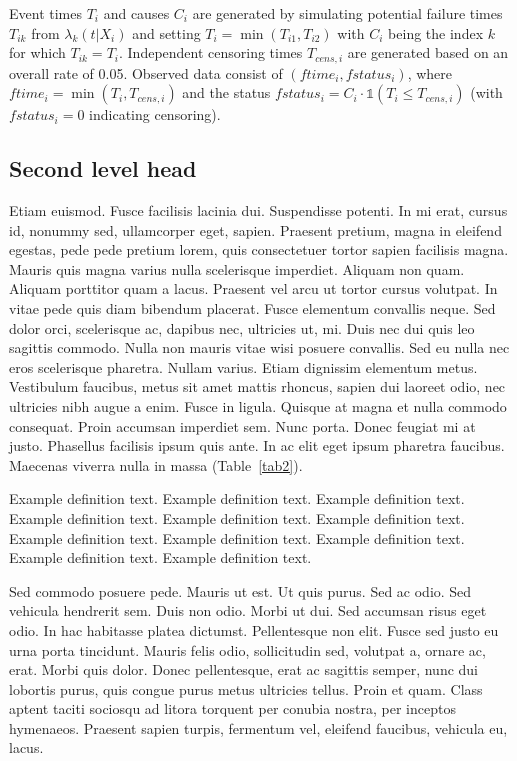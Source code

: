 \documentclass[AMA,Times1COL]{WileyNJDv5} %
\begin{document}
Event times $T_i$ and causes $C_i$ are generated by simulating potential failure times $T_{ik}$ from $\lambda_k(t|X_i)$ and setting $T_i = \min(T_{i1}, T_{i2})$ with $C_i$ being the index $k$ for which $T_{ik} = T_i$. Independent censoring times $T_{cens, i}$ are generated based on an overall rate of 0.05. Observed data consist of $(ftime_i, fstatus_i)$, where $ftime_i = \min(T_i, T_{cens, i})$ and the status $fstatus_i = C_i \cdot \mathds{1}(T_i \le T_{cens, i})$ (with $fstatus_i=0$ indicating censoring).


\subsection{Second level head}

Etiam euismod. Fusce facilisis lacinia dui. Suspendisse potenti. In mi erat, cursus id, nonummy sed, ullamcorper
eget, sapien. Praesent pretium, magna in eleifend egestas, pede pede pretium lorem, quis consectetuer tortor sapien
facilisis magna. Mauris quis magna varius nulla scelerisque imperdiet. Aliquam non quam. Aliquam porttitor quam
a lacus. Praesent vel arcu ut tortor cursus volutpat. In vitae pede quis diam bibendum placerat. Fusce elementum
convallis neque. Sed dolor orci, scelerisque ac, dapibus nec, ultricies ut, mi. Duis nec dui quis leo sagittis commodo.
Nulla non mauris vitae wisi posuere convallis. Sed eu nulla nec eros scelerisque pharetra. Nullam varius. Etiam
dignissim elementum metus. Vestibulum faucibus, metus sit amet mattis rhoncus, sapien dui laoreet odio, nec ultricies
nibh augue a enim. Fusce in ligula. Quisque at magna et nulla commodo consequat. Proin accumsan imperdiet sem.
Nunc porta. Donec feugiat mi at justo. Phasellus facilisis ipsum quis ante. In ac elit eget ipsum pharetra faucibus.
Maecenas viverra nulla in massa (Table~\ref{tab2}).

\begin{definition}
Example definition text. Example definition text. Example definition text. Example definition text. Example definition text. Example definition text. Example definition text. Example definition text. Example definition text. Example definition text. Example definition text.
\end{definition}

Sed commodo posuere pede. Mauris ut est. Ut quis purus. Sed ac odio. Sed vehicula hendrerit sem. Duis non
odio. Morbi ut dui. Sed accumsan risus eget odio. In hac habitasse platea dictumst. Pellentesque non elit. Fusce
sed justo eu urna porta tincidunt. Mauris felis odio, sollicitudin sed, volutpat a, ornare ac, erat. Morbi quis dolor.
Donec pellentesque, erat ac sagittis semper, nunc dui lobortis purus, quis congue purus metus ultricies tellus. Proin
et quam. Class aptent taciti sociosqu ad litora torquent per conubia nostra, per inceptos hymenaeos. Praesent sapien
turpis, fermentum vel, eleifend faucibus, vehicula eu, lacus.
\end{document}
